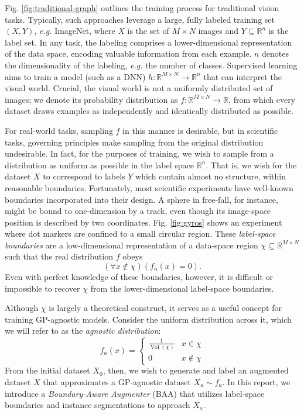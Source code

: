 \documentclass[10pt, journal]{IEEEtran}
\DeclareMathOperator{\vol}{Vol}
\begin{document}
Fig. \ref{fig:traditional-graph} outlines the training process for traditional
vision tasks. Typically, such approaches leverage a large, fully labeled
training set $(X,Y)$, \textit{e.g.} ImageNet, where $X$ is the set of
$M\times N$ images and $Y\subseteq \mathbb{R}^n$ is the label set. In any task,
the labeling comprises a lower-dimensional representation of the data space,
encoding valuable information from each example. $n$ denotes the dimensionality
of the labeling, \textit{e.g.} the number of classes. Supervised learning aims
to train a model (such as a DNN)
$h : \mathbb{R}^{M\times N} \rightarrow \mathbb{R}^n$ that can interpret the
visual world. Crucial, the visual world is not a uniformly distributed set of
images; we denote its probability distribution as
$f : \mathbb{R}^{M\times N} \rightarrow \mathbb{R}$, from which every dataset
draws examples as independently and identically distributed as possible.

For real-world tasks, sampling $f$ in this manner is desirable, but in
scientific tasks, governing principles make sampling from the original
distribution undesirable. In fact, for the purposes of training, we wish to
sample from a distribution as uniform as possible in the label space
$\mathbb{R}^n$. That is, we wish for the dataset $X$ to correspond to labels $Y$
which contain almost no structure, within reasonable boundaries. Fortunately,
most scientific experiments have well-known boundaries incorporated into their
design. A sphere in free-fall, for instance, might be bound to one-dimension by
a track, even though its image-space position is described by two
coordinates. Fig. \ref{fig:gyros} shows an experiment where dot markers are
confined to a small circular region. These \emph{label-space boundaries} are a
low-dimensional representation of a data-space region
$\chi \subseteq \mathbb{R}^{M\times N}$ such that the real distribution $f$
obeys
\[ (\forall x \not\in \chi)(f_n(x) = 0). \] Even with perfect knowledge of these
boundaries, however, it is difficult or impossible to recover $\chi$ from the
lower-dimensional label-space boundaries.

Although $\chi$ is largely a theoretical construct, it serves as a useful
concept for training GP-agnostic models. Consider the uniform distribution
across it, which we will refer to as the \emph{agnostic distribution}:
\[ f_a(x) =
  \begin{cases}
    \frac{1}{\vol(\chi)} & x \in \chi \\
    0 & x \not\in \chi
  \end{cases}
\] From the initial dataset $X_0$, then, we wish to generate and label an
augmented dataset $X$ that approximates a GP-agnostic dataset $X_a \sim f_a$. In
this report, we introduce a \emph{Boundary-Aware Augmenter} (BAA) that utilizes
label-space boundaries and instance segmentations to approach $X_a$.
\end{document}
